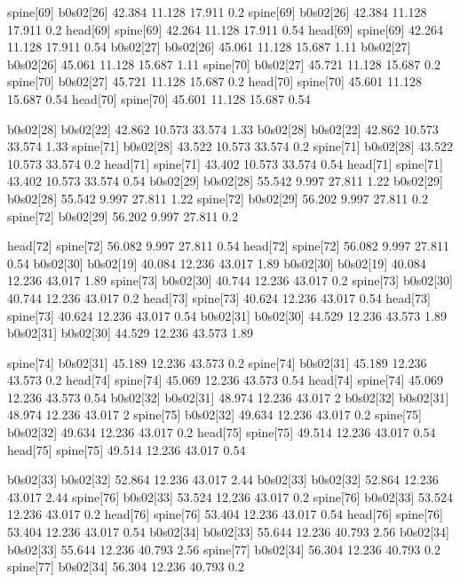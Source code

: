 spine[69]    b0s02[26]    42.384    11.128    17.911    0.2
spine[69]    b0s02[26]    42.384    11.128    17.911    0.2
head[69]    spine[69]    42.264    11.128    17.911    0.54
head[69]    spine[69]    42.264    11.128    17.911    0.54
b0s02[27]    b0s02[26]    45.061    11.128    15.687    1.11
b0s02[27]    b0s02[26]    45.061    11.128    15.687    1.11
spine[70]    b0s02[27]    45.721    11.128    15.687    0.2
spine[70]    b0s02[27]    45.721    11.128    15.687    0.2
head[70]    spine[70]    45.601    11.128    15.687    0.54
head[70]    spine[70]    45.601    11.128    15.687    0.54


b0s02[28]    b0s02[22]    42.862    10.573    33.574    1.33
b0s02[28]    b0s02[22]    42.862    10.573    33.574    1.33
spine[71]    b0s02[28]    43.522    10.573    33.574    0.2
spine[71]    b0s02[28]    43.522    10.573    33.574    0.2
head[71]    spine[71]    43.402    10.573    33.574    0.54
head[71]    spine[71]    43.402    10.573    33.574    0.54
b0s02[29]    b0s02[28]    55.542    9.997    27.811    1.22
b0s02[29]    b0s02[28]    55.542    9.997    27.811    1.22
spine[72]    b0s02[29]    56.202    9.997    27.811    0.2
spine[72]    b0s02[29]    56.202    9.997    27.811    0.2


head[72]    spine[72]    56.082    9.997    27.811    0.54
head[72]    spine[72]    56.082    9.997    27.811    0.54
b0s02[30]    b0s02[19]    40.084    12.236    43.017    1.89
b0s02[30]    b0s02[19]    40.084    12.236    43.017    1.89
spine[73]    b0s02[30]    40.744    12.236    43.017    0.2
spine[73]    b0s02[30]    40.744    12.236    43.017    0.2
head[73]    spine[73]    40.624    12.236    43.017    0.54
head[73]    spine[73]    40.624    12.236    43.017    0.54
b0s02[31]    b0s02[30]    44.529    12.236    43.573    1.89
b0s02[31]    b0s02[30]    44.529    12.236    43.573    1.89


spine[74]    b0s02[31]    45.189    12.236    43.573    0.2
spine[74]    b0s02[31]    45.189    12.236    43.573    0.2
head[74]    spine[74]    45.069    12.236    43.573    0.54
head[74]    spine[74]    45.069    12.236    43.573    0.54
b0s02[32]    b0s02[31]    48.974    12.236    43.017    2
b0s02[32]    b0s02[31]    48.974    12.236    43.017    2
spine[75]    b0s02[32]    49.634    12.236    43.017    0.2
spine[75]    b0s02[32]    49.634    12.236    43.017    0.2
head[75]    spine[75]    49.514    12.236    43.017    0.54
head[75]    spine[75]    49.514    12.236    43.017    0.54


b0s02[33]    b0s02[32]    52.864    12.236    43.017    2.44
b0s02[33]    b0s02[32]    52.864    12.236    43.017    2.44
spine[76]    b0s02[33]    53.524    12.236    43.017    0.2
spine[76]    b0s02[33]    53.524    12.236    43.017    0.2
head[76]    spine[76]    53.404    12.236    43.017    0.54
head[76]    spine[76]    53.404    12.236    43.017    0.54
b0s02[34]    b0s02[33]    55.644    12.236    40.793    2.56
b0s02[34]    b0s02[33]    55.644    12.236    40.793    2.56
spine[77]    b0s02[34]    56.304    12.236    40.793    0.2
spine[77]    b0s02[34]    56.304    12.236    40.793    0.2


